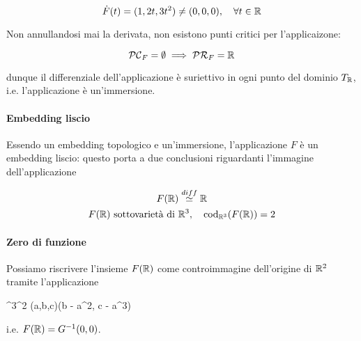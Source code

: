 {\begin{equation}
	\dot{F}(t) = (1, 2 t, 3 t^{2}) \neq (0,0,0) \qcomma \forall t \in \R
\end{equation}

Non annullandosi mai la derivata, non esistono punti critici per l'applicaizone:

\begin{equation}
	\mathcal{PC}_{F} = \emptyset \implies \mathcal{PR}_{F} = \mathbb{R}
\end{equation}

dunque il differenziale dell'applicazione è suriettivo in ogni punto del dominio $ T_{\mathbb{R}} $, i.e. l'applicazione è un'immersione.

\paragraph{Embedding liscio}

Essendo un embedding topologico e un'immersione, l'applicazione $ F $ è un embedding liscio: questo porta a due conclusioni riguardanti l'immagine dell'applicazione

\begin{gather}
	F(\R) \stackrel{diff}{\simeq} \R \\
	F(\R) \text{ sottovarietà di } \R^{3} \qcomma \operatorname{cod}_{\R^{3}} (F(\R)) = 2
\end{gather}

\paragraph{Zero di funzione}

Possiamo riscrivere l'insieme $ F(\mathbb{R}) $ come controimmagine dell'origine di $ \mathbb{R}^{2} $ tramite l'applicazione

	{\R^{3}}{\R^{2}}
	{(a,b,c)}{(b - a^{2}, c - a^{3})}

i.e. $ F(\mathbb{R}) = G^{-1}(0,0) $.
}


